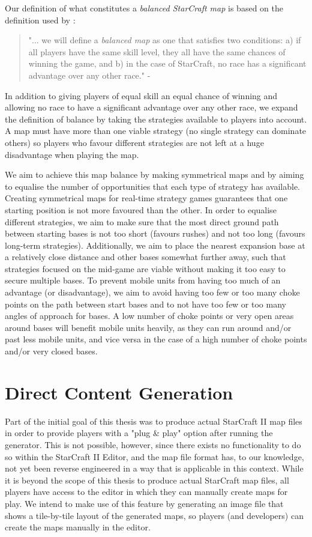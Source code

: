 Our definition of what constitutes a \textit{balanced StarCraft map} is based on the definition used by \citeauthor{uriarte2013psmage}\cite{uriarte2013psmage}:
\begin{quote}
	"... we will define a \textit{balanced map} as one that satisfies two conditions: a) if all players have the same skill level, they all have the same chances of winning the game, and b) in the case of StarCraft, no race has a significant advantage over any other race." - \citeauthor{uriarte2013psmage}\cite{uriarte2013psmage}
\end{quote}

In addition to giving players of equal skill an equal chance of winning and allowing no race to have a significant advantage over any other race, we expand the definition of balance by taking the strategies available to players into account. A map must have more than one viable strategy (no single strategy can dominate others) so players who favour different strategies are not left at a huge disadvantage when playing the map. 

We aim to achieve this map balance by making symmetrical maps and by aiming to equalise the number of opportunities that each type of strategy has available. Creating symmetrical maps for real-time strategy games guarantees that one starting position is not more favoured than the other. In order to equalise different strategies, we aim to make sure that the most direct ground path between starting bases is not too short (favours rushes) and not too long (favours long-term strategies). Additionally, we aim to place the nearest expansion base at a relatively close distance and other bases somewhat further away, such that strategies focused on the mid-game are viable without making it too easy to secure multiple bases. To prevent mobile units from having too much of an advantage (or disadvantage), we aim to avoid having too few or too many choke points on the path between start bases and to not have too few or too many angles of approach for bases. A low number of choke points or very open areas around bases will benefit mobile units heavily, as they can run around and/or past less mobile units, and vice versa in the case of a high number of choke points and/or very closed bases.

\section{Direct Content Generation}
\label{goals_representation}
Part of the initial goal of this thesis was to produce actual StarCraft II map files in order to provide players with a "plug \& play" option after running the generator. This is not possible, however, since there exists no functionality to do so within the StarCraft II Editor, and the map file format has, to our knowledge, not yet been reverse engineered in a way that is applicable in this context. While it is beyond the scope of this thesis to produce actual StarCraft map files, all players have access to the editor in which they can manually create maps for play. We intend to make use of this feature by generating an image file that shows a tile-by-tile layout of the generated maps, so players (and developers) can create the maps manually in the editor.

